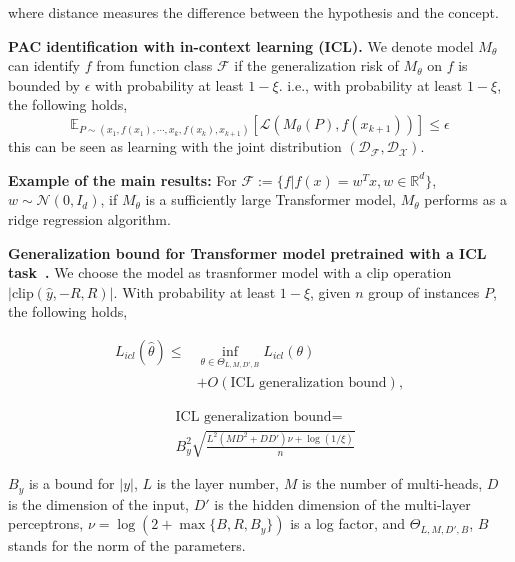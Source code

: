  where distance measures the difference between the hypothesis and the concept.

  
\begin{definition}
    \textbf{PAC identification with in-context learning (ICL).} We denote model $M_\theta$ can identify $f$ from function class $\mathcal{F}$ if the generalization risk of $M_\theta$ on $f$ is bounded by $\epsilon$ with probability at least $1-\xi$. i.e., with probability at least $1-\xi$, the following holds,
    \begin{equation}
        \mathbb{E}_{P\sim (x_1, f(x_1), \cdots, x_k, f(x_k), x_{k + 1})} [\mathcal L (M_\theta(P), f( x_{k + 1}))] \leq \epsilon
    \end{equation}
    this can be seen as learning with the joint distribution $(\mathcal{D}_{\mathcal{F}}, \mathcal{D}_{\mathcal X} )$.
\end{definition}

\textbf{Example of the main results: } For $\mathcal{F} := \{f| f(x) = w^T x , w \in \mathbb{R}^d\}$, $w\sim \mathcal{N} (0, I_d)$, if $M_\theta$ is a sufficiently large Transformer model, $M_\theta$ performs as a ridge regression algorithm. 

\begin{lemma}\label{lemma:icl_generalization_bound}
\textbf{Generalization bound for Transformer model pretrained with a ICL task~\cite{bai2024transformers}.}
We choose the model as trasnformer model with a clip operation \\ $|\text{clip}(\hat y, -R, R)|$. With probability at least $1-\xi$, given $n$ group of instances $P$, the following holds,



\begin{equation}
    \begin{aligned}
    L_{icl}(\hat{\theta}) \leq  &\inf_{\theta \in \Theta_{L,M,D',B}} L_{icl}(\theta) 
    \\ &  + O\left(\text{ICL generalization bound}\right),
    \end{aligned}
\end{equation}


\begin{equation}
    \begin{aligned}
    & \text{ICL generalization bound} = \\
    & B_y^2\sqrt{\frac{L^2(MD^2+DD') \nu + \log(1/\xi)}{n}}
    \end{aligned}
\end{equation}


$B_y$ is a bound for $|y|$, $L$ is the layer number, $M$ is the number of multi-heads, $D$ is the dimension of the input, $D'$ is the hidden dimension of the multi-layer perceptrons, $\nu =\log(2 + \max\{B, R, B_y\})$ is a log factor, and $\Theta_{L,M,D',B}$, $B$ stands for the norm of the parameters. 
\end{lemma}

